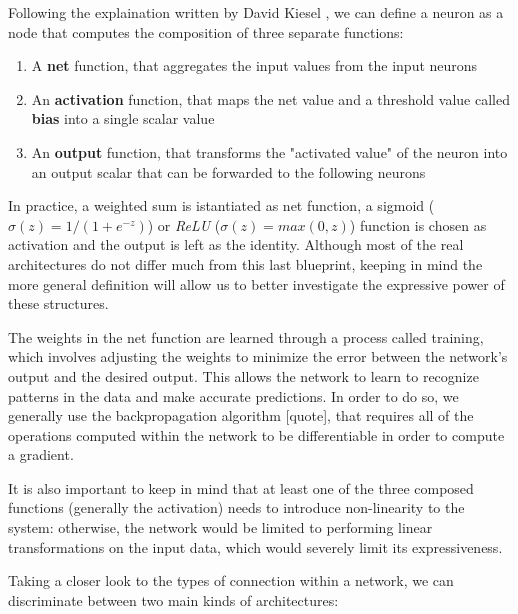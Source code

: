 \documentclass{article}
\begin{document}
Following the explaination written by David Kiesel \cite{KRI07}, we can define a neuron as a node that computes the composition of three separate functions:

\begin{enumerate}
    \item A \textbf{net} function, that aggregates the input values from the input neurons
    \item An \textbf{activation} function, that maps the net value and a threshold value called \textbf{bias} into a single scalar value
    \item An \textbf{output} function, that transforms the "activated value" of the neuron into an output scalar that can be forwarded to the following neurons
\end{enumerate}

In practice, a weighted sum is istantiated as net function, a sigmoid ($\sigma(z)=1/(1+e^{-z})$) or \textit{ReLU} ($\sigma(z) = max(0,z)$) function is chosen as activation and the output is left as the identity. Although most of the real architectures do not differ much from this last blueprint, keeping in mind the more general definition will allow us to better investigate the expressive power of these structures.

The weights in the net function are learned through a process called training, which involves adjusting the weights to minimize the error between the network's output and the desired output. This allows the network to learn to recognize patterns in the data and make accurate predictions. In order to do so, we generally use the backpropagation algorithm [quote], that requires all of the operations computed within the network to be differentiable in order to compute a gradient.

It is also important to keep in mind that at least one of the three composed functions (generally the activation) needs to introduce non-linearity to the system: otherwise, the network would be limited to performing linear transformations on the input data, which would severely limit its expressiveness.

Taking a closer look to the types of connection within a network, we can discriminate between two main kinds of architectures:
\end{document}
